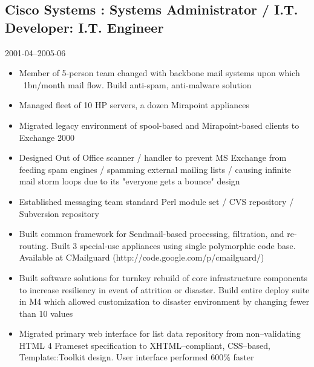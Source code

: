 \documentclass[]{article}
\begin{document}
\subsection*{Cisco Systems : Systems Administrator / I.T. Developer: I.T. Engineer}
  \label{ciscosystems_rdfa_cisco_1_title/_rdfa_cisco_1_titleb:_rdfa_cisco_1_desc}
  2001-04--2005-06
\begin{itemize}
    \item{Member of 5-person team changed with  backbone mail systems upon which ~1bn/month mail flow.  Build anti-spam, anti-malware solution}
    \item{Managed fleet of 10 HP servers, a dozen Mirapoint appliances}
    \item{Migrated legacy environment of spool-based and Mirapoint-based clients to Exchange 2000}
    \item{Designed Out of Office scanner / handler to prevent MS Exchange from feeding spam engines / spamming external mailing lists / causing infinite mail storm loops due to its "everyone gets a bounce" design}
    \item{Established messaging team standard Perl module set / CVS repository / Subversion repository}
    \item{Built common framework for Sendmail-based processing, filtration, and re-routing.  Built 3 special-use appliances using single polymorphic code base.  Available at CMailguard (http://code.google.com/p/cmailguard/)}
    \item{Built software solutions for turnkey rebuild of core infrastructure components to increase resiliency in event of attrition or disaster.  Build entire deploy suite in M4 which allowed customization to disaster environment by changing fewer than 10 values}
    \item{Migrated primary web interface for list data repository from non–validating HTML 4 Frameset specification to XHTML–compliant, CSS–based, Template::Toolkit design.  User interface performed 600{\%} faster}
\end{itemize}
       
\end{document}
